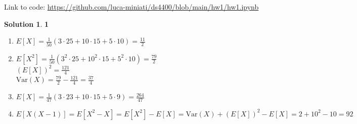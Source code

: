 \documentclass[11pt]{article}
\theoremstyle{definition}
\theoremstyle{nopunct}
\newtheorem*{s}{Solution}
\begin{document}
Link to code: \href{https://github.com/luca-miniati/ds4400/blob/main/hw1/hw1.ipynb}{https://github.com/luca-miniati/ds4400/blob/main/hw1/hw1.ipynb}

\begin{s}\textbf{1}
    \begin{enumerate} 
        \item $E[X] = \frac{1}{50}(3 \cdot 25 + 10 \cdot 15 + 5 \cdot 10) = \frac{11}{2}$

        \item
            $E[X^2] = \frac{1}{50}(3^2 \cdot 25 + 10^2 \cdot 15 + 5^2 \cdot 10) = \frac{79}{2}$ \bigskip\\
            $(E[X])^2 = \frac{121}{4}$ \bigskip\\
            $\text{Var}(X) = \frac{79}{2} - \frac{121}{4} = \frac{37}{4}$

        \item $E[X] = \frac{1}{47}(3 \cdot 23 + 10 \cdot 15 + 5 \cdot 9) = \frac{264}{47}$

        \item $E[X(X - 1)] = E[X^2 - X] = E[X^2] - E[X] = \text{Var}(X) + (E[X])^2 - E[X] = 2 + 10^2 - 10 = 92$
    \end{enumerate} 
\end{s}

\vspace{10pt}
\end{document}
